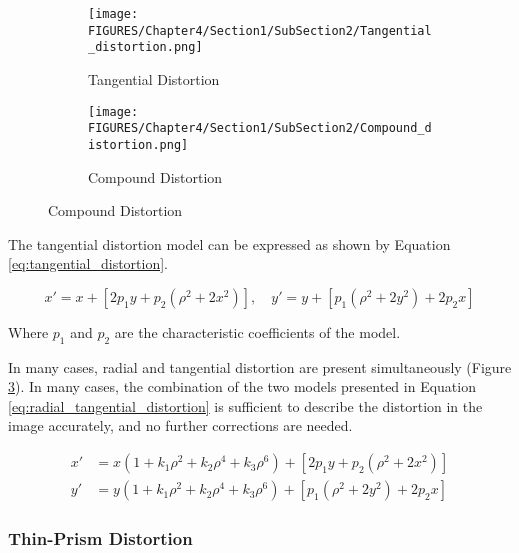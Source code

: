 \begin{figure}[htbp]
  \centering
  \begin{subfigure}[b]{0.48\textwidth}
      \centering
      \texttt{[image: FIGURES/Chapter4/Section1/SubSection2/Tangential\_distortion.png]}
      \caption{Tangential Distortion}
      \label{fig:tangential_distortion}
  \end{subfigure}
  \hfill
  \begin{subfigure}[b]{0.48\textwidth}
      \centering
      \texttt{[image: FIGURES/Chapter4/Section1/SubSection2/Compound\_distortion.png]}
      \caption{Compound Distortion}
      \label{fig:compound_distortion}
  \end{subfigure}
\end{figure}

The tangential distortion model can be expressed as shown by Equation \ref{eq:tangential_distortion}.

\begin{equation}
  x' = x + [2p_1 y + p_2(\rho^2 + 2x^2)],
  \quad
  y' = y + [p_1(\rho^2 + 2y^2) + 2p_2 x]
  \label{eq:tangential_distortion}
\end{equation}

Where $p_1$ and $p_2$ are the characteristic coefficients of the model.

In many cases, radial and tangential distortion are present simultaneously (Figure \ref{fig:compound_distortion}). 
In many cases, the combination of the two models presented in Equation \ref{eq:radial_tangential_distortion} is sufficient to describe the distortion in the image accurately, and no further corrections are needed.

\begin{equation}
  \begin{aligned}
  x' &= x \left( 1 + k_1 \rho^2 + k_2 \rho^4 + k_3 \rho^6 \right) + \left[ 2p_1 y + p_2 \left( \rho^2 + 2x^2 \right) \right] \\
  y' &= y \left( 1 + k_1 \rho^2 + k_2 \rho^4 + k_3 \rho^6 \right) + \left[ p_1 \left(\rho^2 + 2y^2 \right) + 2p_2 x \right]
  \end{aligned}
  \label{eq:radial_tangential_distortion}
  \end{equation}

\subsubsection{Thin-Prism Distortion}

